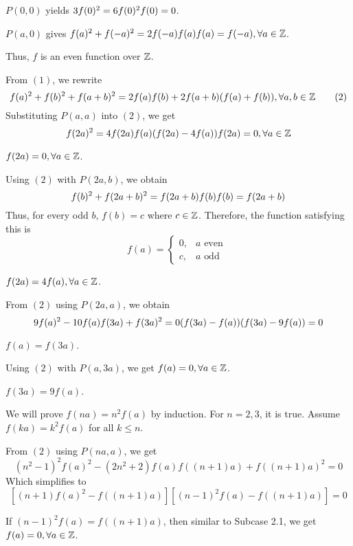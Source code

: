 \documentclass[11pt]{scrartcl}
\begin{document}
\begin{itemize}[label=, leftmargin=0em, itemsep=0.2em]
\begin{sol}
        \( P(0,0) \) yields \( 3f(0)^2 = 6f(0)^2 \ra f(0) = 0 \).

        \( P(a,0) \) gives \( f(a)^2 + f(-a)^2 = 2f(-a)f(a) \ra f(a) = f(-a), \forall a \in \bb{Z} \).

        Thus, \( f \) is an even function over \( \mathbb{Z} \).

        From \( (1) \), we rewrite
        \[
            f(a)^2 + f(b)^2 + f(a + b)^2 = 2f(a)f(b) + 2f(a + b)(f(a) + f(b)), \forall a,b \in \mathbb{Z} \tag{2}
        \]
        Substituting \( P(a,a) \) into \( (2) \), we get
        \[
            f(2a)^2 = 4f(2a)f(a) \ra (f(2a) - 4f(a))f(2a) = 0, \forall a \in \bb{Z}
        \]

         \( f(2a) = 0, \forall a \in \mathbb{Z} \).

        Using \( (2) \) with \( P(2a,b) \), we obtain
        \[
            f(b)^2 + f(2a + b)^2 = f(2a + b)f(b) \ra f(b) = f(2a + b)
        \]
        Thus, for every odd \( b \), \( f(b) = c \) where \( c \in \mathbb{Z} \). Therefore, the function satisfying this is 
        \[
        \boxed{ f(a)=
        \left\{\begin{array}{rr}0,&a \text{ even }\\
            c,&a \text{ odd }
        \end{array}
        \right.
        }
        \]

         \( f(2a) = 4f(a), \forall a \in \mathbb{Z} \).

        From \( (2) \) using \( P(2a,a) \), we obtain
        \[
            9f(a)^2 - 10f(a)f(3a) + f(3a)^2 = 0 \ra (f(3a) - f(a))(f(3a) - 9f(a)) = 0
        \]

         \( f(a) = f(3a) \).

        Using \( (2) \) with \( P(a,3a) \), we get \( f(a) = 0, \forall a \in \mathbb{Z} \).

         \( f(3a) = 9f(a) \).

        We will prove \( f(na) = n^2f(a) \) by induction. For \( n = 2,3 \), it is true. Assume \( f(ka) = k^2f(a) \) for all \( k \leq n \).

        From \( (2) \) using \( P(na,a) \), we get
        \[
            (n^2 - 1)^2f(a)^2 - (2n^2 + 2)f(a)f((n + 1)a) + f((n + 1)a)^2 = 0
        \]
        Which simplifies to
        \[
            [(n + 1)f(a)^2 - f((n + 1)a)][(n - 1)^2f(a) - f((n + 1)a)] = 0
        \]

        If \( (n - 1)^2f(a) = f((n + 1)a) \), then similar to Subcase 2.1, we get \( f(a) = 0, \forall a \in \mathbb{Z} \).


\end{sol}
\end{itemize}
\end{document}
